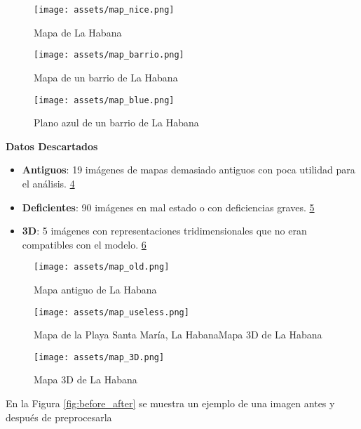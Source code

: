\documentclass[twocolumn, fontsize=10pt]{article}
\begin{document}
    \begin{figure}[H]
    \centering
    \texttt{[image: assets/map\_nice.png]}
    \caption{Mapa de La Habana}
    \label{fig:map_nice}
\end{figure}

   \begin{figure}[H]
    \centering
    \texttt{[image: assets/map\_barrio.png]}
    \caption{Mapa de un barrio de La Habana}
    \label{fig:map_barrio}
\end{figure}

   \begin{figure}[H]
    \centering
    \texttt{[image: assets/map\_blue.png]}
    \caption{Plano azul de un barrio de La Habana}
    \label{fig:map_blue}
\end{figure}

\textbf{Datos Descartados}
\begin{itemize}
    \item \textbf{Antiguos}: 19 imágenes de mapas demasiado antiguos con poca utilidad para el análisis. \ref{fig:map_old}
    \item \textbf{Deficientes}: 90 imágenes en mal estado o con deficiencias graves. \ref{fig:map_useless}
    \item \textbf{3D}: 5 imágenes con representaciones tridimensionales que no eran compatibles con el modelo. \ref{fig:map_3D}
\end{itemize}

  \begin{figure}[H]
    \centering
    \texttt{[image: assets/map\_old.png]}
    \caption{Mapa antiguo de La Habana}
    \label{fig:map_old}
\end{figure}

  \begin{figure}[H]
    \centering
    \texttt{[image: assets/map\_useless.png]}
    \caption{Mapa de la Playa Santa María, La HabanaMapa 3D de La Habana}
    \label{fig:map_useless}
\end{figure}

  \begin{figure}[H]
    \centering
    \texttt{[image: assets/map\_3D.png]}
    \caption{Mapa 3D de La Habana}
    \label{fig:map_3D}
\end{figure}

En la Figura \ref{fig:before_after} se muestra un ejemplo de una imagen antes y después de preprocesarla
\end{document}
